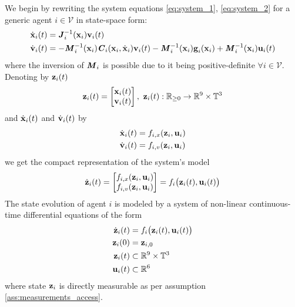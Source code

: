 We begin by rewriting the system equations \eqref{eq:system_1},
\eqref{eq:system_2} for a generic agent $i \in \mathcal{V}$ in state-space form:
\begin{subequations}
\begin{align}
  \dot{\bm{\mathbf{x}}}_i(t) &= \bm{\mathit{J}}_i^{-1}(\bm{\mathbf{x}}_i) \bm{\mathbf{v}}_i(t) \\
  \dot{\bm{\mathbf{v}}}_i(t) &= -\bm{\mathit{M}}_i^{-1}(\bm{\mathbf{x}}_i)\bm{\mathit{C}}_i(\bm{\mathbf{x}}_i,\dot{\bm{\mathbf{x}}}_i) \bm{\mathbf{v}}_i(t)
    - \bm{\mathit{M}}_i^{-1}(\bm{\mathbf{x}}_i)\bm{\mathbf{g}}_i(\bm{\mathbf{x}}_i)
    + \bm{\mathit{M}}_i^{-1}(\bm{\mathbf{x}}_i)\bm{\mathbf{u}}_i(t)
\end{align}
\label{eq:state_space_system}
\end{subequations}
where the inversion of $\bm{\mathit{M}}_i$ is possible due to it being
positive-definite $\forall i \in \mathcal{V}$. Denoting by $\bm{\mathbf{z}}_i(t)$
\begin{align}
  \bm{\mathbf{z}}_i(t) =
    \begin{bmatrix}
      \bm{\mathbf{x}}_i(t) \\
      \bm{\mathbf{v}}_i(t) \\
    \end{bmatrix},\
    \bm{\mathbf{z}}_i(t) : \mathbb{R}_{\geq 0} \to \mathbb{R}^9 \times \mathbb{T}^3
\end{align}
and
$\dot{\bm{\mathbf{x}}}_i(t)$ and $\dot{\bm{\mathbf{v}}}_i(t)$ by
\begin{subequations}
\begin{align}
  \dot{\bm{\mathbf{x}}}_i(t) &= f_{i,x}(\bm{\mathbf{z}}_i, \bm{\mathbf{u}}_i) \\
  \dot{\bm{\mathbf{v}}}_i(t) &= f_{i,v}(\bm{\mathbf{z}}_i, \bm{\mathbf{u}}_i)
\end{align}
\end{subequations}
we get the compact representation of the system's model
\begin{align}
  \dot{\bm{\mathbf{z}}}_i(t) =
    \begin{bmatrix}
      f_{i,x}(\bm{\mathbf{z}}_i, \bm{\mathbf{u}}_i) \\
      f_{i,v}(\bm{\mathbf{z}}_i, \bm{\mathbf{u}}_i)
    \end{bmatrix} =
 f_i \big(\bm{\mathbf{z}}_i (t), \bm{\mathbf{u}}_i (t)\big)
\end{align}
The state evolution of agent $i$ is modeled by a system of non-linear
continuous-time differential equations of the form
\begin{align}
  \dot{\bm{\mathbf{z}}}_i(t) &= f_i \big(\bm{\mathbf{z}}_i (t), \bm{\mathbf{u}}_i (t)\big) \label{eq:non_perturbed_system}\\
  \bm{\mathbf{z}}_i(0) &= \bm{\mathbf{z}}_{i,0} \\
  \bm{\mathbf{z}}_i (t) & \subset \mathbb{R}^{9} \times \mathbb{T}^3 \\
  \bm{\mathbf{u}}_i (t) & \subset \mathbb{R}^6
\end{align}
where state $\bm{\mathbf{z}}_i$ is directly measurable as per assumption
\eqref{ass:measurements_access}.

